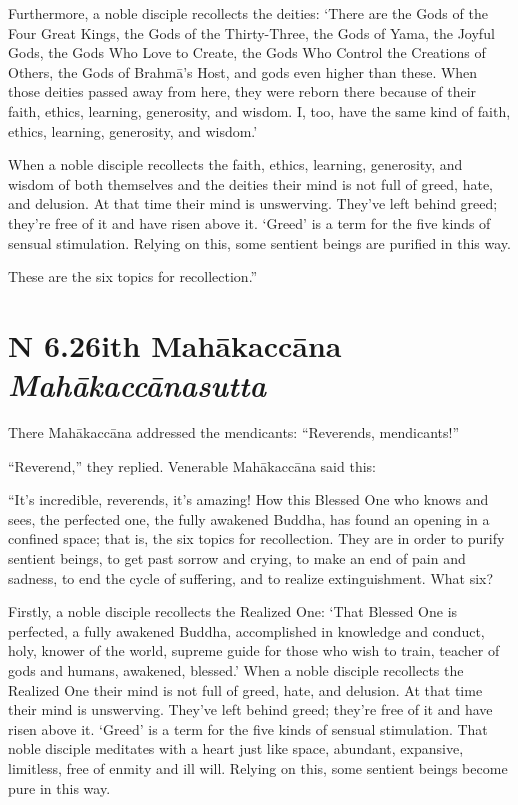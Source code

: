 \documentclass[12pt,openany]{book}%
\newcommand*{\suttatitleacronym}[1]{\smaller[2]{#1}\vspace*{.3em}}
\newcommand*{\suttatitletranslation}[1]{\linebreak{#1}}
\newcommand*{\suttatitleroot}[1]{\linebreak\smaller[2]\itshape{#1}}
\newcommand*{\tocacronym}[1]{\hspace*{-3.3em}{#1}\quad}
\newcommand*{\toctranslation}[1]{#1}
\newcommand*{\tocroot}[1]{(\textit{#1})}
\begin{document}
Furthermore, a noble disciple recollects the deities: ‘There are the Gods of the Four Great Kings, the Gods of the Thirty-Three, the Gods of Yama, the Joyful Gods, the Gods Who Love to Create, the Gods Who Control the Creations of Others, the Gods of \textsanskrit{Brahmā}’s Host, and gods even higher than these. When those deities passed away from here, they were reborn there because of their faith, ethics, learning, generosity, and wisdom. I, too, have the same kind of faith, ethics, learning, generosity, and wisdom.’ 

When a noble disciple recollects the faith, ethics, learning, generosity, and wisdom of both themselves and the deities their mind is not full of greed, hate, and delusion. At that time their mind is unswerving. They’ve left behind greed; they’re free of it and have risen above it. ‘Greed’ is a term for the five kinds of sensual stimulation. Relying on this, some sentient beings are purified in this way. 

These are the six topics for recollection.” 

%
\section*{{\suttatitleacronym AN 6.26}{\suttatitletranslation With Mahākaccāna }{\suttatitleroot Mahākaccānasutta}}
\addcontentsline{toc}{section}{\tocacronym{AN 6.26} \toctranslation{With Mahākaccāna } \tocroot{Mahākaccānasutta}}

There \textsanskrit{Mahākaccāna} addressed the mendicants: “Reverends, mendicants!” 

“Reverend,” they replied. Venerable \textsanskrit{Mahākaccāna} said this: 

“It’s incredible, reverends, it’s amazing! How this Blessed One who knows and sees, the perfected one, the fully awakened Buddha, has found an opening in a confined space; that is, the six topics for recollection. They are in order to purify sentient beings, to get past sorrow and crying, to make an end of pain and sadness, to end the cycle of suffering, and to realize extinguishment. What six? 

Firstly, a noble disciple recollects the Realized One: ‘That Blessed One is perfected, a fully awakened Buddha, accomplished in knowledge and conduct, holy, knower of the world, supreme guide for those who wish to train, teacher of gods and humans, awakened, blessed.’ When a noble disciple recollects the Realized One their mind is not full of greed, hate, and delusion. At that time their mind is unswerving. They’ve left behind greed; they’re free of it and have risen above it. ‘Greed’ is a term for the five kinds of sensual stimulation. That noble disciple meditates with a heart just like space, abundant, expansive, limitless, free of enmity and ill will. Relying on this, some sentient beings become pure in this way. 
\end{document}
